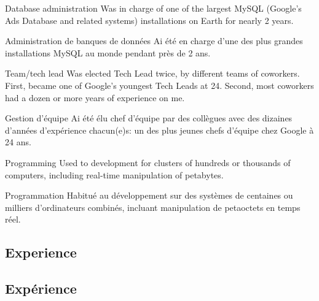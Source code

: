 \begin{description}

\begin{langen}
\item[Database administration] Was in charge of one of the largest MySQL (Google's Ads Database and related systems) installations on Earth for nearly 2 years.
\end{langen}
\begin{langfr}
\item[Administration de banques de donn\'{e}es] Ai \'{e}t\'{e} en charge d'une des plus grandes installations MySQL au monde pendant pr\`{e}s de 2 ans.
\end{langfr}

\vspace{2 mm}

\begin{langen}
\item[Team/tech lead] Was elected Tech Lead twice, by different teams of coworkers. First, became one of Google's youngest Tech Leads at 24. Second, most coworkers had a dozen or more years of experience on me.
\end{langen}
\begin{langfr}
\item[Gestion d'\'{e}quipe] Ai \'{e}t\'{e} \'{e}lu chef d'\'{e}quipe par des coll\`{e}gues avec des dizaines d'ann\'{e}es d'exp\'{e}rience chacun(e)s: un des plus jeunes chefs d'\'{e}quipe chez Google \`{a} 24 ans.
\end{langfr}

\vspace{2 mm}

\begin{langen}
\item[Programming] Used to development for clusters of hundreds or thousands of computers, including real-time manipulation of petabytes.
\end{langen}
\begin{langfr}
\item[Programmation] Habitu\'{e} au d\'{e}veloppement sur des syst\`{e}mes de centaines ou milliers d'ordinateurs combin\'{e}s, incluant manipulation de petaoctets en temps r\'{e}el.
\end{langfr}

\end{description}

\begin{langen}
\section{Experience}
\end{langen}
\begin{langfr}
\section{Exp\'{e}rience}
\end{langfr}

